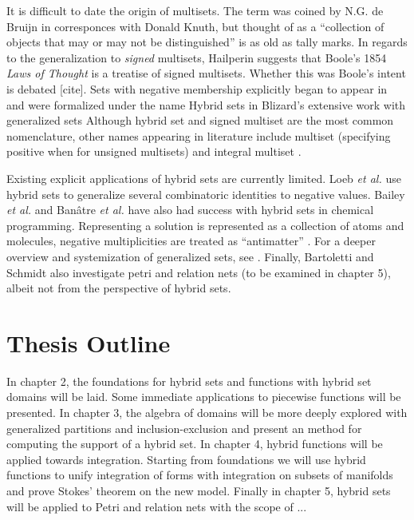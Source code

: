 It is difficult to date the origin of multisets. The term was coined by N.G. de Bruijn in corresponces with Donald Knuth, \cite{knuth2014art}
but thought of as a ``collection of objects that may or may not be distinguished'' is as old as tally marks. 
In regards to the generalization to \emph{signed} multisets, Hailperin \cite{hailperin1986boole} suggests that Boole's 1854 \emph{Laws of Thought} \cite{boole1854investigation} is a treatise of signed multisets.
Whether this was Boole's intent is debated 
[cite]. %
Sets with negative membership explicitly began to appear in \cite{whitney1933characteristic} and were formalized under the name Hybrid sets in Blizard's extensive work with generalized sets \cite{blizard1988, blizard1990} 
Although hybrid set and signed multiset are the most common nomenclature, other names appearing in literature include
multiset (specifying positive when for unsigned multisets) \cite{reisig1985petri} 
and integral multiset \cite{wildberger2003new}. 

Existing explicit applications of hybrid sets are currently limited.
Loeb \emph{et al.} \cite{damiani1991, loeb1992} use hybrid sets to generalize several combinatoric identities to negative values.
Bailey \emph{et al.} \cite{bailey2009hypergraphic} and Ban\^{a}tre \emph{et al.} \cite{banatre2006} have also had success with hybrid sets in chemical programming. 
Representing a solution is represented as a collection of atoms and molecules, negative multiplicities are treated as ``antimatter'' . 
For a deeper overview and systemization of generalized sets, see \cite{singh2007, singh2008systematization}.
Finally, Bartoletti \cite{bartolettilending, bartoletti2013} and Schmidt \cite{schmidt1995parameterized} also investigate petri and relation nets (to be examined in chapter 5), albeit not from the perspective of hybrid sets.



\section{Thesis Outline}



In chapter 2, the foundations for hybrid sets and functions with hybrid set domains will be laid. Some immediate applications to piecewise functions will be presented.
In chapter 3, the algebra of domains will be more deeply explored with generalized partitions and inclusion-exclusion and present an method for computing the support of a hybrid set.
In chapter 4, hybrid functions will be applied towards integration. Starting from foundations we will use hybrid functions to unify integration of forms with integration on subsets of manifolds and prove Stokes' theorem on the new model.
Finally in chapter 5, hybrid sets will be applied to Petri and relation nets with the scope of ...



